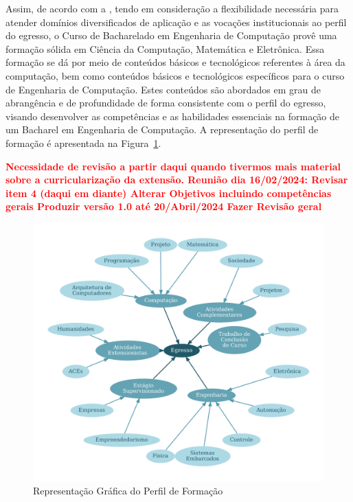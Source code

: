 Assim, de acordo com a , tendo em consideração a flexibilidade necessária para atender domínios diversificados de aplicação e as vocações institucionais ao perfil do egresso, o Curso de Bacharelado em Engenharia de Computação provê uma formação sólida em Ciência da Computação, Matemática e Eletrônica. Essa formação se dá por meio de conteúdos básicos e tecnológicos referentes à área da computação, bem como conteúdos básicos e tecnológicos específicos para o curso de Engenharia de Computação. Estes conteúdos são abordados em grau de abrangência e de profundidade de forma consistente com o perfil do egresso, visando desenvolver as competências e as habilidades essenciais na formação de um Bacharel em Engenharia de Computação. A representação do perfil de formação é apresentada na Figura~\ref{fig:perfil}.

\textcolor{red}{\Large \textbf{Necessidade de revisão a partir daqui quando tivermos mais material sobre a curricularização da extensão.
Reunião dia 16/02/2024:
Revisar item 4 (daqui em diante)
Alterar Objetivos incluindo competências gerais
Produzir versão 1.0 até 20/Abril/2024
Fazer Revisão geral
}}


\begin{figure}[H] %
    \centering
    \caption{Representação Gráfica do Perfil de Formação}
    \label{fig:perfil}
    \includegraphics[width=\textwidth]{enc/imagens/Perfil.pdf}
\end{figure}

